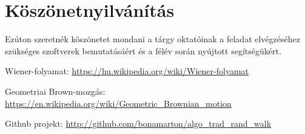 \documentclass[a4paper, 12pt]{article}
\numberwithin{equation}{section}          %
\numberwithin{figure}{subsection}
\begin{document}
	\clearpage \vspace*{2cm}
	\setcounter{secnumdepth}{0}
 
	\section{Köszönetnyilvánítás}
	
		Ezúton szeretnék köszönetet mondani a tárgy oktatóinak a feladat elvégzéséhez szükséges
		szoftverek bemutatásáért és a félév során nyújtott segítségükért.
	
	
	\newpage \vspace*{2cm}
	
	
	\begin{thebibliography}{9}
		
		 Wiener-folyamat:
			\url{https://hu.wikipedia.org/wiki/Wiener-folyamat}
		
		 Geometriai Brown-mozgás:
		 	\url{https://en.wikipedia.org/wiki/Geometric_Brownian_motion}
		
		 Github projekt: \url{http://github.com/bonamarton/algo_trad_rand_walk}
		
	\end{thebibliography}

		
\end{document}

